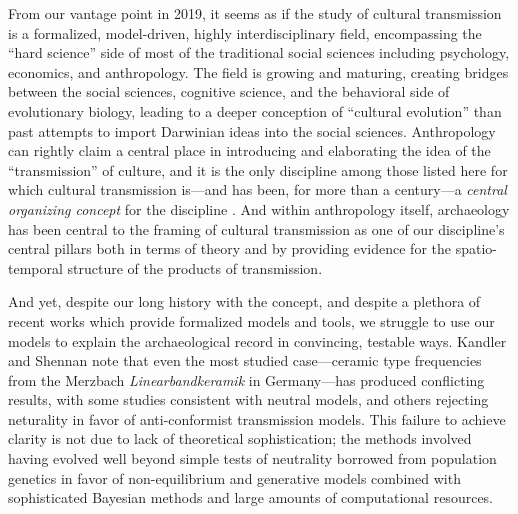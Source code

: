 
From our vantage point in 2019, it seems as if the study of cultural transmission is a formalized, model-driven, highly interdisciplinary field, encompassing the ``hard science'' side of most of the traditional social sciences including psychology, economics, and anthropology.  The field is growing and maturing, creating bridges between the social sciences, cognitive science, and the behavioral side of evolutionary biology, leading to a deeper conception of ``cultural evolution'' than past attempts to import Darwinian ideas into the social sciences.  Anthropology can rightly claim a central place in introducing and elaborating the idea of the ``transmission'' of culture, and it is the only discipline among those listed here for which cultural transmission is---and has been, for more than a century---a \emph{central organizing concept} for the discipline \citep{lyman2008cultural}.  And within anthropology itself, archaeology has been central to the framing of cultural transmission as one of our discipline's central pillars both in terms of theory and by providing evidence for the spatio-temporal structure of the products of transmission.

And yet, despite our long history with the concept, and despite a plethora of recent works which provide formalized models and tools, we struggle to use our models to explain the archaeological record in convincing, testable ways.  Kandler and Shennan \citeyearpar{Kandler20150905} note that even the most studied case---ceramic type frequencies from the Merzbach \emph{Linearbandkeramik} in Germany---has produced conflicting results, with some studies consistent with neutral models, and others rejecting neturality in favor of anti-conformist transmission models.  This failure to achieve clarity is not due to lack of theoretical sophistication; the methods involved having evolved well beyond simple tests of neutrality borrowed from population genetics in favor of non-equilibrium and generative models combined with sophisticated Bayesian methods and large amounts of computational resources.  


